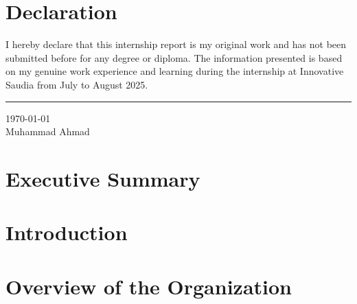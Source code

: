 \chapter*{Declaration}

I hereby declare that this internship report is my original work and has not been submitted before for any degree or diploma. The information presented is based on my genuine work experience and learning during the internship at Innovative Saudia from July to August 2025.

\vspace{2cm}
\noindent
\rule{5cm}{0.4pt} \quad \today\\
Muhammad Ahmad

\tableofcontents
\newpage

\chapter*{Executive Summary}


\newpage

\chapter{Introduction}

\newpage

\chapter{Overview of the Organization}

\newpage

